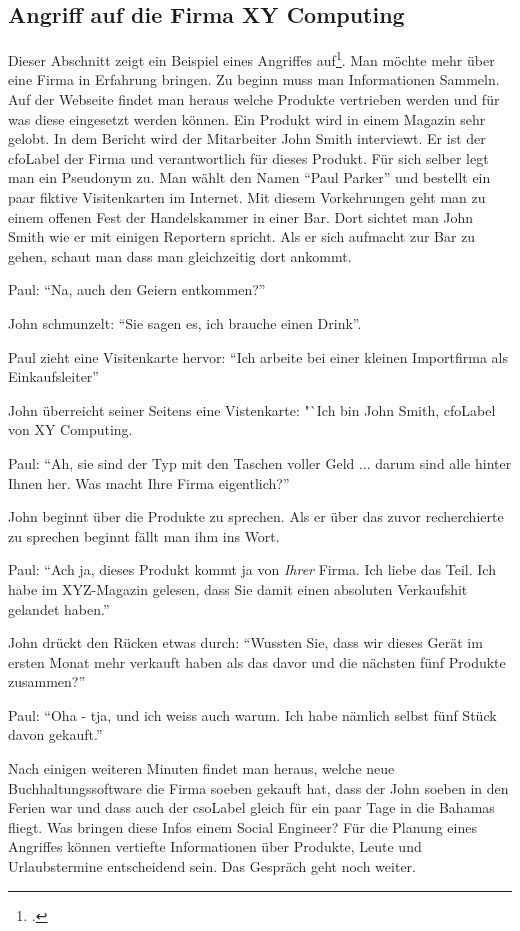 \subsection{Angriff auf die Firma XY Computing}
Dieser Abschnitt zeigt ein Beispiel eines Angriffes auf\footcite{human_hacking}. Man möchte mehr über eine Firma in Erfahrung bringen. Zu beginn muss man Informationen Sammeln. Auf der Webseite findet man heraus welche Produkte vertrieben werden und für was diese eingesetzt werden können. Ein Produkt wird in einem Magazin sehr gelobt. In dem Bericht wird der Mitarbeiter John Smith interviewt. Er ist der \Gls{cfoLabel} der Firma und verantwortlich für dieses Produkt.
Für sich selber legt man ein Pseudonym zu. Man wählt den Namen "`Paul Parker"' und bestellt ein paar fiktive Visitenkarten im Internet. 
Mit diesem Vorkehrungen geht man zu einem offenen Fest der Handelskammer in einer Bar. Dort sichtet man John Smith wie er mit einigen Reportern spricht. Als er sich aufmacht zur Bar zu gehen, schaut man dass man gleichzeitig dort ankommt. 

Paul: "`Na, auch den Geiern entkommen?"'

John schmunzelt: "`Sie sagen es, ich brauche einen Drink"'.

Paul zieht eine Visitenkarte hervor: "`Ich arbeite bei einer kleinen Importfirma als Einkaufsleiter"'

John überreicht seiner Seitens eine Vistenkarte: "`Ich bin John Smith, \Gls{cfoLabel} von XY Computing.

Paul: "`Ah, sie sind der Typ mit den Taschen voller Geld ... darum sind alle hinter Ihnen her. Was macht Ihre Firma eigentlich?"'

John beginnt über die Produkte zu sprechen. Als er über das zuvor recherchierte zu sprechen beginnt fällt man ihm ins Wort.

Paul: "`Ach ja, dieses Produkt kommt ja von \textit{Ihrer} Firma. Ich liebe das Teil. Ich habe im XYZ-Magazin gelesen, dass Sie damit einen absoluten Verkaufshit gelandet haben."'

John drückt den Rücken etwas durch: "`Wussten Sie, dass wir dieses Gerät im ersten Monat mehr verkauft haben als das davor und die nächsten fünf Produkte zusammen?"'

Paul: "`Oha - tja, und ich weiss auch warum. Ich habe nämlich selbst fünf Stück davon gekauft."'

Nach einigen weiteren Minuten findet man heraus, welche neue Buchhaltungssoftware die Firma soeben gekauft hat, dass der John soeben in den Ferien war und dass auch der \Gls{csoLabel} gleich für ein paar Tage in die Bahamas fliegt. Was bringen diese Infos einem Social Engineer? Für die Planung eines Angriffes können vertiefte Informationen über Produkte, Leute und Urlaubstermine entscheidend sein. Das Gespräch geht noch weiter.

